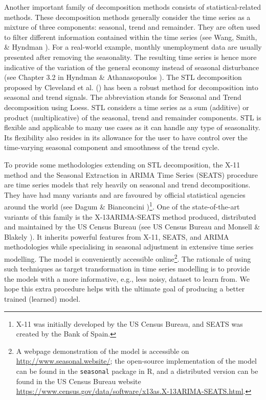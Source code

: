 Another important family of decomposition methods consists of statistical-related methods. These decomposition methods generally consider the time series as a mixture of three components: seasonal, trend and remainder. They are often used to filter different information contained within the time series (see Wang, Smith, \& Hyndman \citeyear{wang2006characteristic}). For a real-world example, monthly unemployment data are usually presented after removing the seasonality. The resulting time series is hence more indicative of the variation of the general economy instead of seasonal disturbance (see Chapter 3.2 in Hyndman \& Athanasopoulos \citeyear{forecastingprincipleandpractice}). The STL decomposition proposed by Cleveland et al. (\citeyear{cleveland1990stl}) has been a robust method for decomposition into seasonal and trend signals. The abbreviation stands for Seasonal and Trend decomposition using Loess. STL considers a time series as a sum (additive) or product (multiplicative) of the seasonal, trend and remainder components. STL is flexible and applicable to many use cases as it can handle any type of seasonality. Its flexibility also resides in its allowance for the user to have control over the time-varying seasonal component and smoothness of the trend cycle.

To provide some methodologies extending on STL decomposition, the X-11 method and the Seasonal Extraction in ARIMA Time Series (SEATS) procedure are time series models that rely heavily on seasonal and trend decompositions. They have had many variants and are favoured by official statistical agencies around the world (see Dagum \& Bianconcini \citeyear{dagum2016seasonal})\footnote{X-11 was initially developed by the US Census Bureau, and SEATS was created by the Bank of Spain.}. One of the state-of-the-art variants of this family is the X-13ARIMA-SEATS method produced, distributed and maintained by the US Census Bureau (see US Census Bureau \citeyear{x13arimaseatsmanual} and Monsell \& Blakely \citeyear{monsell2013x}). It inherits powerful features from X-11, SEATS, and ARIMA methodologies while specialising in seasonal adjustment in extensive time series modelling. The model is conveniently accessible online\footnote{A webpage demonstration of the model is accessible on \url{http://www.seasonal.website/}; the open-source implementation of the model can be found in the \verb+seasonal+ package in R, and a distributed version can be found in the US Census Bureau website \url{https://www.census.gov/data/software/x13as.X-13ARIMA-SEATS.html}.}. The rationale of using such techniques as target transformation in time series modelling is to provide the models with a more informative, e.g., less noisy, dataset to learn from. We hope this extra procedure helps with the ultimate goal of producing a better trained (learned) model.

